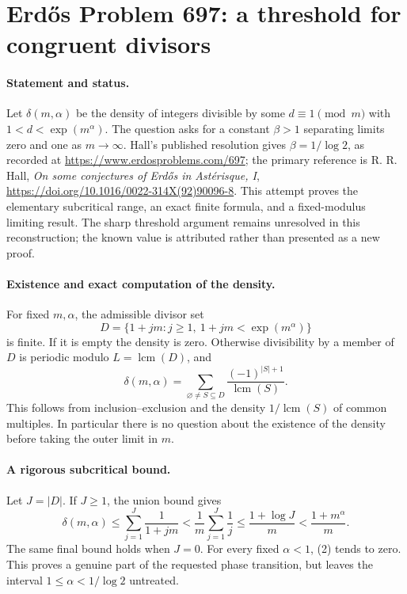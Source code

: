\section*{Erd\H{o}s Problem 697: a threshold for congruent divisors}

\paragraph{Statement and status.}
Let \(\delta(m,\alpha)\) be the density of integers divisible by
some \(d\equiv1\pmod m\) with \(1<d<\exp(m^\alpha)\).
The question asks for a constant \(\beta>1\) separating limits
zero and one as \(m\longrightarrow\infty\).
Hall's published resolution gives \(\beta=1/\log2\), as recorded
at \url{https://www.erdosproblems.com/697};
the primary reference is R. R. Hall,
\emph{On some conjectures of Erd\H{o}s in Ast\'erisque, I},
\url{https://doi.org/10.1016/0022-314X(92)90096-8}.
This attempt proves the elementary subcritical range,
an exact finite formula, and a fixed-modulus limiting result.
The sharp threshold argument remains unresolved in this
reconstruction; the known value is attributed rather than
presented as a new proof.

\paragraph{Existence and exact computation of the density.}
For fixed \(m,\alpha\), the admissible divisor set
\[
 D=\{1+jm:j\geq1,\ 1+jm<\exp(m^\alpha)\}
\]
is finite. If it is empty the density is zero.
Otherwise divisibility by a member of \(D\) is periodic modulo
\(L=\operatorname{lcm}(D)\), and
\[
 \delta(m,\alpha)=
 \sum_{\varnothing\ne S\subseteq D}
       \frac{(-1)^{|S|+1}}{\operatorname{lcm}(S)}.               \tag{1}
\]
This follows from inclusion--exclusion and the density
\(1/\operatorname{lcm}(S)\) of common multiples.
In particular there is no question about the existence of
the density before taking the outer limit in \(m\).

\paragraph{A rigorous subcritical bound.}
Let \(J=|D|\). If \(J\geq1\), the union bound gives
\[
 \delta(m,\alpha)\leq\sum_{j=1}^J\frac1{1+jm}
 <\frac1m\sum_{j=1}^J\frac1j
 \leq\frac{1+\log J}{m}
 <\frac{1+m^\alpha}{m}.                                       \tag{2}
\]
The same final bound holds when \(J=0\).
For every fixed \(\alpha<1\), (2) tends to zero.
This proves a genuine part of the requested phase transition,
but leaves the interval \(1\leq\alpha<1/\log2\) untreated.

